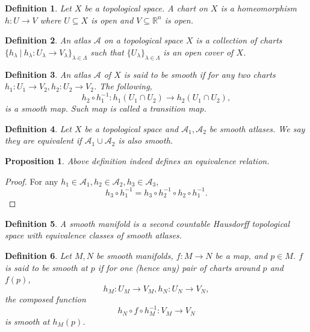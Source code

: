 \documentclass{article}
\newtheorem{proposition}{Proposition}[section]
\newtheorem{definition}{Definition}[section]
\numberwithin{equation}{section}
\begin{document}
\begin{definition}
Let $X$ be a topological space. A chart on $X$ is a homeomorphism $h:U\to V$ where $U\subseteq X$ is open and $V\subseteq \mathbb{R}^n$ is open.
\end{definition}

\begin{definition}
An atlas $\mathcal{A}$ on a topological space $X$ is a collection of charts $\{h_\lambda\:|\: h_\lambda:U_\lambda\to V_\lambda\}_{\lambda\in \Lambda}$ such that
$\{U_\lambda\}_{\lambda\in\Lambda}$ is an open cover of $X$.
\end{definition}

\begin{definition}
An atlas $\mathcal{A}$ of $X$ is said to be smooth if for any two charts $h_1:U_1\to V_2,h_2:U_2\to V_2$. The following,
\begin{equation*}
h_2\circ h_1^{-1}:h_1(U_1\cap U_2)\to h_2(U_1\cap U_2),
\end{equation*}
is a smooth map. Such map is called a transition map.
\end{definition}

\begin{definition}
Let $X$ be a topological space and $\mathcal{A}_1,\mathcal{A}_2$ be smooth atlases. We say they are equivalent if $\mathcal{A}_1\cup\mathcal{A}_2$ is also smooth.
\end{definition}

\begin{proposition}
Above definition indeed defines an equivalence relation.
\end{proposition}
\begin{proof}
For any $h_1\in \mathcal{A}_1,h_2\in \mathcal{A}_2,h_3\in \mathcal{A}_3$, 
\begin{equation*}
h_3\circ h^{-1}_1 = h_3\circ h^{-1}_2\circ h_2\circ h^{-1}_1.
\end{equation*}
\end{proof}



\begin{definition}
A smooth manifold is a second countable Hausdorff topological space with equivalence classes of smooth atlases.
\end{definition}

\begin{definition}
Let $M,N$ be smooth manifolds, $f:M\to N$ be a map, and $p\in M$. $f$ is said to be smooth at $p$ if for one (hence any) pair of charts around $p$ and $f(p)$, 
\begin{equation*}
h_M:U_M\to V_M, h_N:U_N\to V_N,
\end{equation*}
the composed function 
\begin{equation*}
h_N\circ f \circ h_M^{-1}:V_M\to V_N
\end{equation*}
is smooth at $h_M(p)$.
\end{definition}
\end{document}
